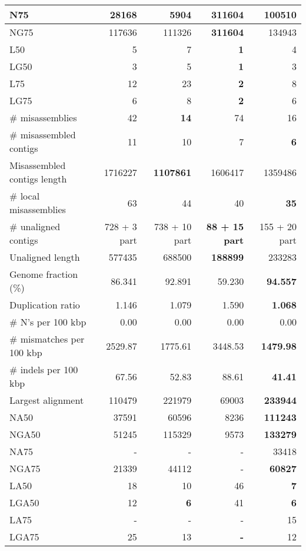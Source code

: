 \documentclass[12pt,a4paper]{article}
\begin{document}
\begin{table}[ht]
\begin{center}
\begin{tabular}{|l*{4}{|r}|}
N75 & 28168 & 5904 & {\bf 311604} & 100510 \\ \hline
NG75 & 117636 & 111326 & {\bf 311604} & 134943 \\ \hline
L50 & 5 & 7 & {\bf 1} & 4 \\ \hline
LG50 & 3 & 5 & {\bf 1} & 3 \\ \hline
L75 & 12 & 23 & {\bf 2} & 8 \\ \hline
LG75 & 6 & 8 & {\bf 2} & 6 \\ \hline
\# misassemblies & 42 & {\bf 14} & 74 & 16 \\ \hline
\# misassembled contigs & 11 & 10 & 7 & {\bf 6} \\ \hline
Misassembled contigs length & 1716227 & {\bf 1107861} & 1606417 & 1359486 \\ \hline
\# local misassemblies & 63 & 44 & 40 & {\bf 35} \\ \hline
\# unaligned contigs & 728 + 3 part & 738 + 10 part & {\bf 88 + 15 part} & 155 + 20 part \\ \hline
Unaligned length & 577435 & 688500 & {\bf 188899} & 233283 \\ \hline
Genome fraction (\%) & 86.341 & 92.891 & 59.230 & {\bf 94.557} \\ \hline
Duplication ratio & 1.146 & 1.079 & 1.590 & {\bf 1.068} \\ \hline
\# N's per 100 kbp & 0.00 & 0.00 & 0.00 & 0.00 \\ \hline
\# mismatches per 100 kbp & 2529.87 & 1775.61 & 3448.53 & {\bf 1479.98} \\ \hline
\# indels per 100 kbp & 67.56 & 52.83 & 88.61 & {\bf 41.41} \\ \hline
Largest alignment & 110479 & 221979 & 69003 & {\bf 233944} \\ \hline
NA50 & 37591 & 60596 & 8236 & {\bf 111243} \\ \hline
NGA50 & 51245 & 115329 & 9573 & {\bf 133279} \\ \hline
NA75 & - & - & - & 33418 \\ \hline
NGA75 & 21339 & 44112 & - & {\bf 60827} \\ \hline
LA50 & 18 & 10 & 46 & {\bf 7} \\ \hline
LGA50 & 12 & {\bf 6} & 41 & {\bf 6} \\ \hline
LA75 & - & - & - & 15 \\ \hline
LGA75 & 25 & 13 & {\bf -} & 12 \\ \hline
\end{tabular}
\end{center}
\end{table}
\end{document}
